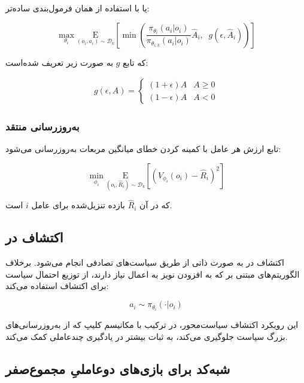 یا با استفاده از همان فرمول‌بندی ساده‌تر:

\begin{equation}
    \max_{\theta_i} \underset{(o_i,a_i) \sim \mathcal{D}_k}{\mathrm{E}}\left[ \min\left( \frac{\pi_{\theta_i}(a_i|o_i)}{\pi_{\theta_{i,k}}(a_i|o_i)} \hat{A}_i, \;\; g(\epsilon, \hat{A}_i) \right) \right]
\end{equation}

که تابع $g$ به صورت زیر تعریف شده‌است:

\begin{align}
    g(\epsilon, A) = \left\{
    \begin{array}{ll}
        (1 + \epsilon) A & A \geq 0 \\
        (1 - \epsilon) A & A < 0
    \end{array}
    \right.
\end{align}

\subsubsection{به‌روزرسانی منتقد}

تابع ارزش هر عامل با کمینه کردن خطای میانگین مربعات به‌روزرسانی می‌شود:

\begin{equation}
    \min_{\phi_i} \underset{(o_i,\hat{R}_i) \sim \mathcal{D}_k}{\mathrm{E}}\left[ \left( V_{\phi_i}(o_i) - \hat{R}_i \right)^2 \right]
\end{equation}

که در آن $\hat{R}_i$ بازده تنزیل‌شده برای عامل $i$ است.

\subsection{اکتشاف در }

اکتشاف در  به صورت ذاتی از طریق سیاست‌های تصادفی انجام می‌شود. برخلاف الگوریتم‌های مبتنی بر  که به افزودن نویز به اعمال نیاز دارند،  از توزیع احتمال سیاست برای اکتشاف استفاده می‌کند:

\begin{equation}
    a_i \sim \pi_{\theta_i}(\cdot|o_i)
\end{equation}

این رویکرد اکتشاف سیاست‌محور، در ترکیب با مکانیسم کلیپ  که از به‌روزرسانی‌های بزرگ سیاست جلوگیری می‌کند، به ثبات بیشتر در یادگیری چند‌عاملی کمک می‌کند.

\subsection{شبه‌کد  برای بازی‌های دو­عاملیِ مجموع­‌صفر}


